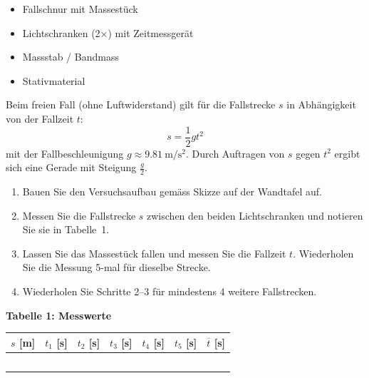 
\begin{itemize}[nosep]
  \item Fallschnur mit Massestück
  \item Lichtschranken (2×) mit Zeitmessgerät
  \item Massstab / Bandmass
  \item Stativmaterial
\end{itemize}


Beim freien Fall (ohne Luftwiderstand) gilt für die Fallstrecke $s$ in
Abhängigkeit von der Fallzeit $t$:
\[
  s = \frac{1}{2} g t^2
\]
mit der Fallbeschleunigung $g \approx \SI{9.81}{\meter\per\second\squared}$.
Durch Auftragen von $s$ gegen $t^2$ ergibt sich eine Gerade mit Steigung
$\frac{g}{2}$.


\begin{enumerate}[nosep]
  \item Bauen Sie den Versuchsaufbau gemäss Skizze auf der Wandtafel auf.
  \item Messen Sie die Fallstrecke $s$ zwischen den beiden Lichtschranken
    und notieren Sie sie in Tabelle~1.
  \item Lassen Sie das Massestück fallen und messen Sie die Fallzeit $t$.
    Wiederholen Sie die Messung 5-mal für dieselbe Strecke.
  \item Wiederholen Sie Schritte 2--3 für mindestens 4 weitere Fallstrecken.
\end{enumerate}

\vspace{0.5em}
\noindent\textbf{Tabelle 1: Messwerte}

\begin{center}
\begin{tabular}{|c|c|c|c|c|c|c|}
  \hline
  $s$ [\si{\meter}] & $t_1$ [\si{\second}] & $t_2$ [\si{\second}] & $t_3$ [\si{\second}] & $t_4$ [\si{\second}] & $t_5$ [\si{\second}] & $\overline{t}$ [\si{\second}] \\
  \hline
   & & & & & & \\[1.5em]
  \hline
   & & & & & & \\[1.5em]
  \hline
   & & & & & & \\[1.5em]
  \hline
   & & & & & & \\[1.5em]
  \hline
   & & & & & & \\[1.5em]
  \hline
\end{tabular}
\end{center}


